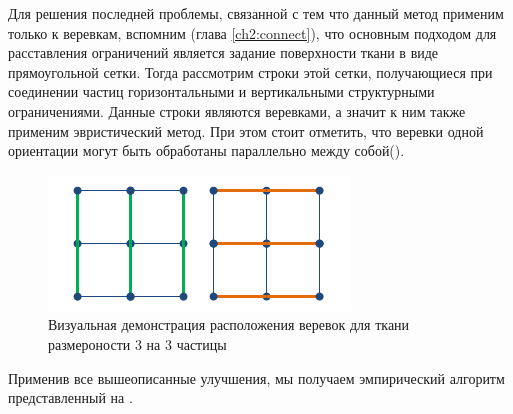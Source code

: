 	Для решения последней проблемы, связанной с тем что данный метод применим только к веревкам, вспомним (глава \ref{ch2:connect}), что основным подходом для расставления ограничений является задание поверхности ткани в виде прямоугольной сетки. Тогда рассмотрим строки этой сетки, получающиеся при соединении частиц горизонтальными и вертикальными структурными ограничениями. Данные строки являются веревками, а значит к ним также применим эвристический метод. При этом стоит отметить, что веревки одной ориентации могут быть обработаны параллельно между собой().
	
	\begin{figure}[ht!] 
		\center
		\includegraphics [scale=0.8] {my_folder/images//bending}
		\caption{Визуальная демонстрация расположения веревок для ткани размероности 3 на 3 частицы}
		\label{fig:ropesInCloth}  
	\end{figure}
	
	Применив все вышеописанные улучшения, мы получаем эмпирический алгоритм представленный на .
	
